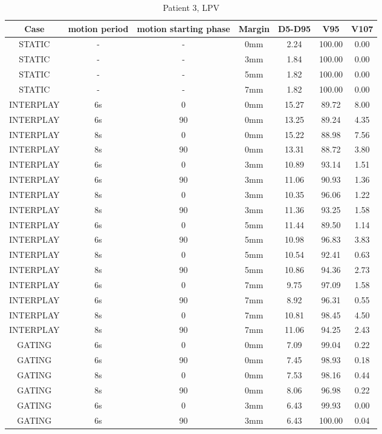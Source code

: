 \begin{table}[H]
  \centering
  \caption{Patient 3, LPV}
  \begin{tabular}{|c||c|c|c||c|c|c|}
    \hline\hline
    Case & motion period & motion starting phase & Margin & D5-D95 & V95 & V107\\
    \hline 
STATIC & - & - & 0mm & 2.24 & 100.00 & 0.00 \\
STATIC & - & - & 3mm & 1.84 & 100.00 & 0.00 \\
STATIC & - & - & 5mm & 1.82 & 100.00 & 0.00 \\
STATIC & - & - & 7mm & 1.82 & 100.00 & 0.00 \\
INTERPLAY & 6s & 0 & 0mm & 15.27 & 89.72 & 8.00 \\
INTERPLAY & 6s & 90 & 0mm & 13.25 & 89.24 & 4.35 \\
INTERPLAY & 8s & 0 & 0mm & 15.22 & 88.98 & 7.56 \\
INTERPLAY & 8s & 90 & 0mm & 13.31 & 88.72 & 3.80 \\
INTERPLAY & 6s & 0 & 3mm & 10.89 & 93.14 & 1.51 \\
INTERPLAY & 6s & 90 & 3mm & 11.06 & 90.93 & 1.36 \\
INTERPLAY & 8s & 0 & 3mm & 10.35 & 96.06 & 1.22 \\
INTERPLAY & 8s & 90 & 3mm & 11.36 & 93.25 & 1.58 \\
INTERPLAY & 6s & 0 & 5mm & 11.44 & 89.50 & 1.14 \\
INTERPLAY & 6s & 90 & 5mm & 10.98 & 96.83 & 3.83 \\
INTERPLAY & 8s & 0 & 5mm & 10.54 & 92.41 & 0.63 \\
INTERPLAY & 8s & 90 & 5mm & 10.86 & 94.36 & 2.73 \\
INTERPLAY & 6s & 0 & 7mm & 9.75 & 97.09 & 1.58 \\
INTERPLAY & 6s & 90 & 7mm & 8.92 & 96.31 & 0.55 \\
INTERPLAY & 8s & 0 & 7mm & 10.81 & 98.45 & 4.50 \\
INTERPLAY & 8s & 90 & 7mm & 11.06 & 94.25 & 2.43 \\
GATING & 6s & 0 & 0mm & 7.09 & 99.04 & 0.22 \\
GATING & 6s & 90 & 0mm & 7.45 & 98.93 & 0.18 \\
GATING & 8s & 0 & 0mm & 7.53 & 98.16 & 0.44 \\
GATING & 8s & 90 & 0mm & 8.06 & 96.98 & 0.22 \\
GATING & 6s & 0 & 3mm & 6.43 & 99.93 & 0.00 \\
GATING & 6s & 90 & 3mm & 6.43 & 100.00 & 0.04 \\

\end{tabular}
\end{table}
